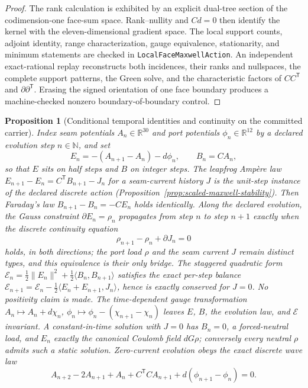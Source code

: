 \documentclass[11pt]{article}
\newtheorem{proposition}[theorem]{Proposition}
\theoremstyle{remark}
\theoremstyle{plain}
\begin{document}
\begin{proof}
The rank calculation is exhibited by an explicit dual-tree section of the
codimension-one face-sum space. Rank--nullity and \(Cd=0\) then identify the
kernel with the eleven-dimensional gradient space. The local support counts,
adjoint identity, range characterization, gauge equivalence, stationarity,
and minimum statements are checked in
\texttt{LocalFaceMaxwellAction}. An independent exact-rational replay
reconstructs both incidences, their ranks and nullspaces, the complete support
patterns, the Green solve, and the characteristic factors of \(CC^{\mathsf T}\)
and \(\partial\partial^{\mathsf T}\). Erasing the signed orientation of one
face boundary produces a machine-checked nonzero boundary-of-boundary
control.
\end{proof}

\begin{proposition}[Conditional temporal identities and continuity on the committed carrier]
\label{prop:temporal-maxwell-evolution}
Index seam potentials \(A_n\in\mathbb R^{30}\) and port potentials
\(\phi_n\in\mathbb R^{12}\) by a declared evolution step \(n\in\mathbb N\),
and set
\[
E_n=-(A_{n+1}-A_n)-d\phi_n,\qquad B_n=CA_n,
\]
so that \(E\) sits on half steps and \(B\) on integer steps. The
leapfrog Amp\`ere law
\(E_{n+1}-E_n=C^{\mathsf T}B_{n+1}-J_n\) for a seam-current history \(J\) is
the unit-step instance of the declared discrete action
(Proposition~\ref{prop:scaled-maxwell-stability}).
Then Faraday's law \(B_{n+1}-B_n=-CE_n\) holds identically. Along the
declared evolution, the Gauss constraint \(\partial E_n=\rho_n\) propagates
from step \(n\) to step \(n+1\) exactly when the discrete continuity
equation
\[
\rho_{n+1}-\rho_n+\partial J_n=0
\]
holds, in both directions; the port load \(\rho\) and the seam current
\(J\) remain distinct types, and this equivalence is their only bridge.
The staggered quadratic form
\(\mathcal E_n=\tfrac12\lVert E_n\rVert^2+\tfrac12\langle B_n,B_{n+1}\rangle\)
satisfies the exact per-step balance
\(\mathcal E_{n+1}=\mathcal E_n-\tfrac12\langle E_n+E_{n+1},J_n\rangle\),
hence is exactly conserved for \(J=0\). No positivity claim is made. The time-dependent gauge
transformation \(A_n\mapsto A_n+d\chi_n\),
\(\phi_n\mapsto\phi_n-(\chi_{n+1}-\chi_n)\) leaves \(E\), \(B\), the
evolution law, and \(\mathcal E\) invariant. A constant-in-time solution
with \(J=0\) has \(B_n=0\), a forced-neutral load, and \(E_n\) exactly the
canonical Coulomb field \(dG\rho\); conversely every neutral \(\rho\) admits
such a static solution. Zero-current evolution obeys the exact discrete wave
law
\[
A_{n+2}-2A_{n+1}+A_n+C^{\mathsf T}CA_{n+1}+d(\phi_{n+1}-\phi_n)=0 .
\]
\end{proposition}
\end{document}
